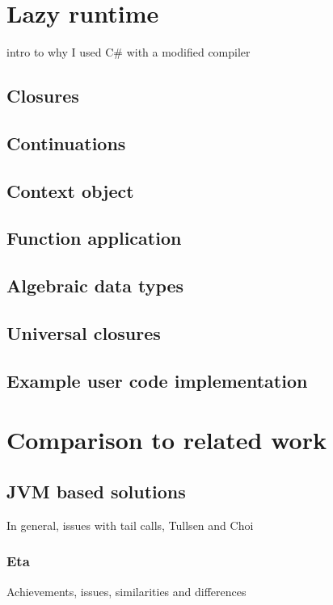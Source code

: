 \documentclass[en]{pracamgr}
\begin{document}
\chapter{Lazy runtime}\label{r:runtime}

intro to why I used C\# with a modified compiler

\section{Closures}

\section{Continuations}

\section{Context object}

\section{Function application}

\section{Algebraic data types}

\section{Universal closures}

\section{Example user code implementation}


\chapter{Comparison to related work}\label{r:alternatives}

\section{JVM based solutions}
In general, issues with tail calls, Tullsen and Choi
\subsection{Eta}
Achievements, issues, similarities and differences
\end{document}
